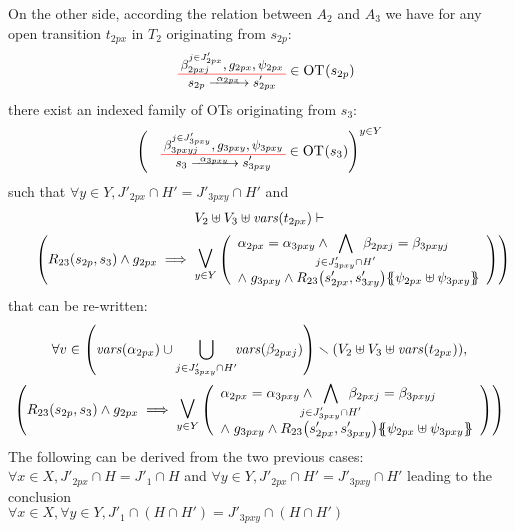 \documentclass[runningheads]{llncs}
\begin{document}
\begin{enumerate}
On the other side, according the relation between $A_2$ and $A_3$ we have for any open transition $t_{2px}$ in $T_2$ originating from $s_{2p}$:
\begin{align*}
\OTx{2p}{x}{2px}{2px} \in \fOT{s_{2p}}
\end{align*}
there exist an indexed family of OTs originating from $s_3$: 
\begin{align*}
\mpar{\OTx{3}{pxy}{3pxy}{3pxy} \in \fOT{s_3}}^{y \in Y} 
\end{align*}
such that $\forall y \in Y, J'_{2px} \cap H' = J'_{3pxy} \cap H'$ and
\begin{multline*}
\everymath{\displaystyle}
V_2 \uplus V_3 \uplus \fvars{t_{2px}} \vdash\\\hspace{2em} \mpar{R_{23}\mpar{s_{2p}, s_{3}} \wedge g_{2px} \implies \operatorname*{\bigsymb{\bigvee}}_{y \in Y} \mpar{\everymath{\displaystyle}
\begin{array}{l}
			 \alpha_{2px}=\alpha_{3pxy} \wedge \bigwedge_\subbox{j \in J'_{3pxy} \cap H'} \beta_{2pxj}=\beta_{3pxyj} \\
			\nwedge g_{3pxy} \wedge R_{23}\mpar{s'_{2px}, s'_{3xy}}\psubst{\psi_{2px} \uplus \psi_{3pxy}}
		\end{array}}} 
\end{multline*}
that can be re-written:
\begin{multline*}
\everymath{\displaystyle}
\forall v\in \mpar{\fvars{\alpha_{2px}}  \cup \bigcup_{j \in J'_{3pxy}
\cap H'} \!\!\fvars{\beta_{2pxj}}} \setminus \mpar{V_2 \uplus V_3 \uplus \fvars{t_{2px}}},\\ \mpar{R_{23}\mpar{s_{2p}, s_{3}} \wedge g_{2px} \implies \operatorname*{\bigsymb{\bigvee}}_{y \in Y} \mpar{\everymath{\displaystyle}
\begin{array}{l}
			 \alpha_{2px}=\alpha_{3pxy} \wedge \bigwedge_\subbox{j \in J'_{3pxy} \cap H'} \beta_{2pxj}=\beta_{3pxyj} \\
			\nwedge g_{3pxy} \wedge R_{23}\mpar{s'_{2px}, s'_{3pxy}}\psubst{\psi_{2px} \uplus \psi_{3pxy}}
		\end{array}}} 
\end{multline*}
The following  can be derived from the two previous cases: \\
$\forall x \in X, J'_{2px} \cap H = J'_1 \cap H$ and
$\forall y \in Y, J'_{2px} \cap H' = J'_{3pxy} \cap H'$ leading to the conclusion\\
$\forall x \in X, \forall y \in Y,  J'_1 \cap (H \cap H') = J'_{3pxy} \cap (H\cap H')$ \\

\end{enumerate}
\end{document}
